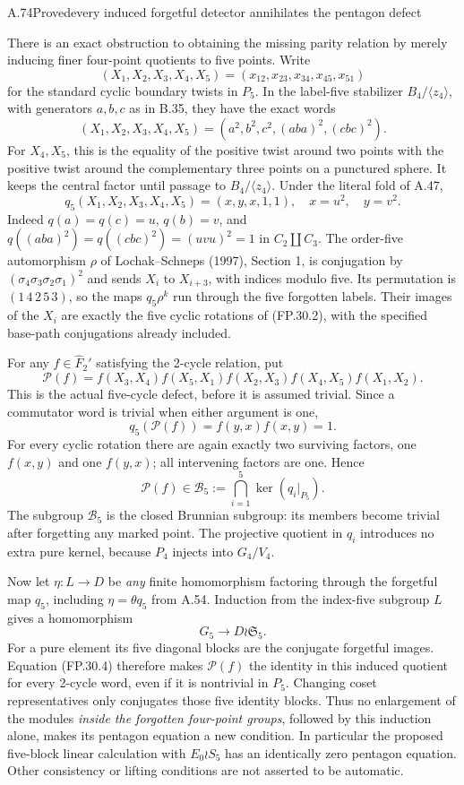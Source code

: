 \begin{statement}{A.74}{Proved}{every induced forgetful detector annihilates the pentagon defect}
\end{statement}
There is an exact obstruction to obtaining the missing parity relation
by merely inducing finer four-point quotients to five points.
Write
\[
 (X_1,X_2,X_3,X_4,X_5)
   =(x_{12},x_{23},x_{34},x_{45},x_{51})
\]
for the standard cyclic boundary twists in $P_5$. In the label-five
stabilizer $B_4/\langle z_4\rangle$, with generators $a,b,c$ as in
B.35, they have the exact words
\[
 (X_1,X_2,X_3,X_4,X_5)
       =(a^2,b^2,c^2,(aba)^2,(cbc)^2).
 \tag{FP.30.1}
\]
For $X_4,X_5$, this is the equality of the positive twist around two
points with the positive twist around the complementary three points
on a punctured sphere. It keeps the central factor until passage to
$B_4/\langle z_4\rangle$. Under the literal fold of A.47,
\[
 q_5(X_1,X_2,X_3,X_4,X_5)=(x,y,x,1,1),
 \quad x=u^2,\quad y=v^2.
 \tag{FP.30.2}
\]
Indeed $q(a)=q(c)=u$, $q(b)=v$, and
$q((aba)^2)=q((cbc)^2)=(uvu)^2=1$ in $C_2\amalg C_3$.
The order-five automorphism $\rho$ of Lochak--Schneps (1997),
Section 1, is conjugation by $(\sigma_4\sigma_3\sigma_2\sigma_1)^2$
and sends $X_i$ to $X_{i+3}$, with indices modulo five.
Its permutation is $(1\,4\,2\,5\,3)$, so the maps
$q_5\rho^k$ run through the five forgotten labels. Their images of
the $X_i$ are exactly the five cyclic rotations of (FP.30.2), with
the specified base-path conjugations already included.

For any $f\in\widehat F_2'$ satisfying the 2-cycle relation, put
\[
 \mathcal P(f)=f(X_3,X_4)f(X_5,X_1)f(X_2,X_3)
                         f(X_4,X_5)f(X_1,X_2).
 \tag{FP.30.3}
\]
This is the actual five-cycle defect, before it is assumed trivial.
Since a commutator word is trivial when either argument is one,
\[
 q_5(\mathcal P(f))=f(y,x)f(x,y)=1.
\]
For every cyclic rotation there are again exactly two surviving
factors, one $f(x,y)$ and one $f(y,x)$; all intervening factors are
one. Hence
\[
 \mathcal P(f)\in\mathcal B_5:=
                \bigcap_{i=1}^{5}\ker(q_i|_{P_5}).
 \tag{FP.30.4}
\]
The subgroup $\mathcal B_5$ is the closed Brunnian subgroup: its
members become trivial after forgetting any marked point. The
projective quotient in $q_i$ introduces no extra pure kernel, because
$P_4$ injects into $G_4/V_4$.

Now let $\eta:L\to D$ be \emph{any} finite homomorphism factoring
through the forgetful map $q_5$, including
$\eta=\theta q_5$ from A.54. Induction from the index-five subgroup
$L$ gives a homomorphism
\[
 G_5\longrightarrow D\wr\mathfrak S_5.
\]
For a pure element its five diagonal blocks are the conjugate
forgetful images. Equation (FP.30.4) therefore makes
$\mathcal P(f)$ the identity in this induced quotient for every
2-cycle word, even if it is nontrivial in $P_5$. Changing coset
representatives only conjugates those five identity blocks.
Thus no enlargement of the modules \emph{inside the forgotten
four-point groups}, followed by this induction alone, makes its
pentagon equation a new condition. In particular the proposed
five-block linear calculation with $E_0\wr S_5$ has an identically
zero pentagon equation. Other consistency or lifting conditions are
not asserted to be automatic.

